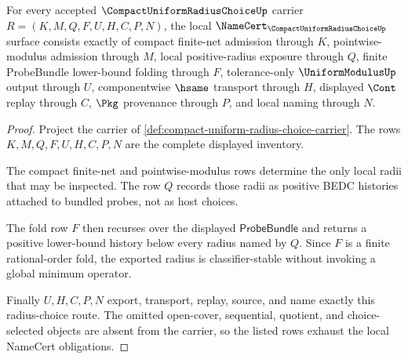 \begin{theorem}
\label{thm:compact-uniform-radius-choice-namecert-obligations}
For every accepted $\CompactUniformRadiusChoiceUp$ carrier $R=(K,M,Q,F,U,H,C,P,N)$, the local $\NameCert_{\CompactUniformRadiusChoiceUp}$ surface consists exactly of compact finite-net admission through $K$, pointwise-modulus admission through $M$, local positive-radius exposure through $Q$, finite ProbeBundle lower-bound folding through $F$, tolerance-only $\UniformModulusUp$ output through $U$, componentwise $\hsame$ transport through $H$, displayed $\Cont$ replay through $C$, $\Pkg$ provenance through $P$, and local naming through $N$.
\end{theorem}
\begin{proof}
Project the carrier of \autoref{def:compact-uniform-radius-choice-carrier}. The rows $K,M,Q,F,U,H,C,P,N$ are the complete displayed inventory.

The compact finite-net and pointwise-modulus rows determine the only local radii that may be inspected. The row $Q$ records those radii as positive BEDC histories attached to bundled probes, not as host choices.

The fold row $F$ then recurses over the displayed $\mathsf{ProbeBundle}$ and returns a positive lower-bound history below every radius named by $Q$. Since $F$ is a finite rational-order fold, the exported radius is classifier-stable without invoking a global minimum operator.

Finally $U,H,C,P,N$ export, transport, replay, source, and name exactly this radius-choice route. The omitted open-cover, sequential, quotient, and choice-selected objects are absent from the carrier, so the listed rows exhaust the local NameCert obligations.
\end{proof}

